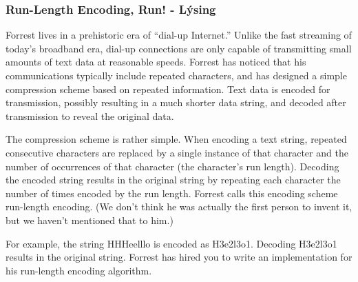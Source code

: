 \documentclass{beamer}
\begin{document}
\begin{frame}
\frametitle{Run-Length Encoding, Run! - Lýsing}
\begin{small}
Forrest lives in a prehistoric era of “dial-up Internet.” Unlike the fast streaming of today’s broadband era, dial-up connections are only capable of transmitting small amounts of text data at reasonable speeds. Forrest has noticed that his communications typically include repeated characters, and has designed a simple compression scheme based on repeated information. Text data is encoded for transmission, possibly resulting in a much shorter data string, and decoded after transmission to reveal the original data.

The compression scheme is rather simple. When encoding a text string, repeated consecutive characters are replaced by a single instance of that character and the number of occurrences of that character (the character’s run length). Decoding the encoded string results in the original string by repeating each character the number of times encoded by the run length. Forrest calls this encoding scheme run-length encoding. (We don’t think he was actually the first person to invent it, but we haven’t mentioned that to him.)

For example, the string HHHeelllo is encoded as H3e2l3o1. Decoding H3e2l3o1 results in the original string. Forrest has hired you to write an implementation for his run-length encoding algorithm.
\end{small}
\end{frame}
\end{document}
